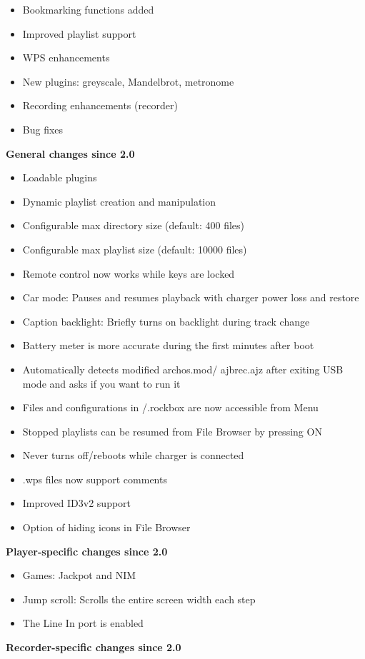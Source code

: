 \begin{itemize}
\item Bookmarking functions added
\item Improved playlist support
\item WPS enhancements
\item New plugins: greyscale, Mandelbrot,
metronome
\item Recording enhancements (recorder)
\item Bug fixes
\end{itemize}
{\bfseries
General changes since 2.0}

\begin{itemize}
\item Loadable plugins
\item Dynamic playlist creation and manipulation
\item Configurable max directory size (default: 400 files)
\item Configurable max playlist size (default: 10000 files)
\item Remote control now works while keys are locked
\item Car mode: Pauses and resumes playback with charger power loss and
restore
\item Caption backlight: Briefly turns on backlight during track change
\item Battery meter is more accurate during the first minutes after boot
\item Automatically detects modified archos.mod/ ajbrec.ajz after
exiting USB mode and asks if you want to run it
\item Files and configurations in /.rockbox are now accessible from Menu
\item Stopped playlists can be resumed from File Browser by pressing ON
\item Never turns off/reboots while charger is connected
\item .wps files now support comments
\item Improved ID3v2 support
\item Option of hiding icons in File Browser
\end{itemize}
{\bfseries
Player{}-specific changes since 2.0}

\begin{itemize}
\item Games: Jackpot and NIM
\item Jump scroll: Scrolls the entire screen width each step
\item The Line In port is enabled
\end{itemize}
{\bfseries
Recorder{}-specific changes since 2.0}

